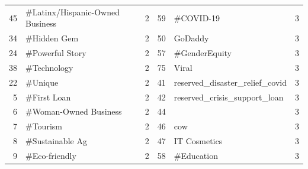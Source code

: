 \begin{longtable}{|r|l|l|r|l|l|}
	45                                & \#Latinx/Hispanic-Owned Business   & 2                                                  & 59                               & \#COVID-19                          & 3                                          \\
	34                                & \#Hidden Gem                       & 2                                                  & 50                               & GoDaddy                             & 3                                          \\
	24                                & \#Powerful Story                   & 2                                                  & 57                               & \#GenderEquity                      & 3                                          \\
	38                                & \#Technology                       & 2                                                  & 75                               & Viral                               & 3                                          \\
	22                                & \#Unique                           & 2                                                  & 41                               & reserved\_disaster\_relief\_covid   & 3                                          \\
	5                                 & \#First Loan                       & 2                                                  & 42                               & reserved\_crisis\_support\_loan     & 3                                          \\
	6                                 & \#Woman-Owned Business             & 2                                                  & 44                               &                                     & 3                                          \\
	7                                 & \#Tourism                          & 2                                                  & 46                               & cow                                 & 3                                          \\
	8                                 & \#Sustainable Ag                   & 2                                                  & 47                               & IT Cosmetics                        & 3                                          \\
	9                                 & \#Eco-friendly                     & 2                                                  & 58                               & \#Education                         & 3                                          \\

\end{longtable}
